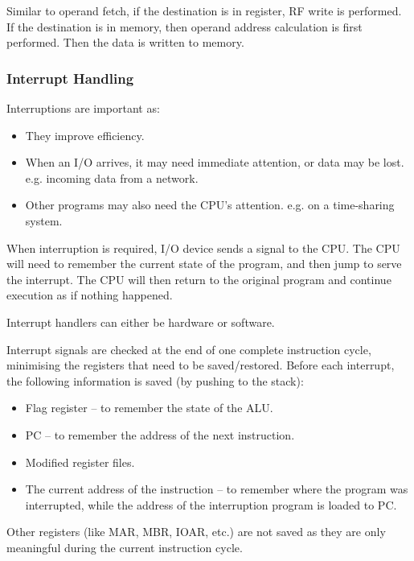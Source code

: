 Similar to operand fetch, if the destination is in register, RF write is performed.
If the destination is in memory, then operand address calculation is first performed.
Then the data is written to memory.

\subsubsection{Interrupt Handling} \label{subsubsec:interrupts}

Interruptions are important as:
\begin{itemize}
    \item They improve efficiency.
    \item When an I/O arrives, it may need immediate attention, or data may be lost.
        e.g. incoming data from a network.
    \item Other programs may also need the CPU's attention. e.g. on a time-sharing system.
\end{itemize}

When interruption is required, I/O device sends a signal to the CPU. The CPU will need to
remember the current state of the program, and then jump to serve the interrupt. The CPU
will then return to the original program and continue execution as if nothing happened.

Interrupt handlers can either be hardware or software.

Interrupt signals are checked at the end of one complete instruction cycle, minimising the
registers that need to be saved/restored. Before each interrupt, the following information
is saved (by pushing to the stack):
\begin{itemize}
    \item Flag register -- to remember the state of the ALU.
    \item PC -- to remember the address of the next instruction.
    \item Modified register files.
    \item The current address of the instruction -- to remember where the program was
        interrupted, while the address of the interruption program is loaded to PC.
\end{itemize}
Other registers (like MAR, MBR, IOAR, etc.) are not saved as they are only meaningful
during the current instruction cycle.